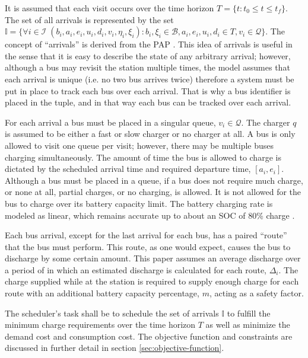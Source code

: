 \documentclass[ee,msthesis]{usuthesis}
\newcommand{\visit}{(b_i, a_i, e_i, u_i, d_i, v_i, \eta_i, \xi_i)}
\newcommand{\I}{\mathbb{I}}                 %
\newcommand{\Iset}{\mathcal{I}}             %
\newcommand{\Bset}{\mathcal{B}}             %
\newcommand{\Qset}{\mathcal{Q}}             %
\begin{document}
It is assumed that each visit occurs over the time horizon \(T = \{t : t_0 \le t \le t_f \}\). The set of all arrivals is
represented by the set \(\I = \{\forall i \in \Iset \; \visit: b_i, \xi_i \in \Bset, a_i, e_i, u_i, d_i \in T, v_i \in \Qset \}\). The
concept of ``arrivals'' is derived from the PAP \cite{qarebagh-2019-optim-sched}. This idea of arrivals is useful in the
sense that it is easy to describe the state of any arbitrary arrival; however, although a bus may revisit the station
multiple times, the model assumes that each arrival is unique (i.e. no two bus arrives twice) therefore a system must be
put in place to track each bus over each arrival. That is why a bus identifier is placed in the tuple, and in that way
each bus can be tracked over each arrival.

For each arrival a bus must be placed in a singular queue, \(v_i \in \Qset\). The charger \(q\) is assumed to be either a fast
or slow charger or no charger at all. A bus is only allowed to visit one queue per visit; however, there may be multiple
buses charging simultaneously. The amount of time the bus is allowed to charge is dictated by the scheduled arrival time
and required departure time, \([a_i, e_i]\). Although a bus must be placed in a queue, if a bus does not require much
charge, or none at all, partial charges, or no charging, is allowed. It is not allowed for the bus to charge over its
battery capacity limit. The battery charging rate is modeled as linear, which remains accurate up to about an SOC of 80\%
charge \cite{li-2016-batter-elect}.

Each bus arrival, except for the last arrival for each bus, has a paired ``route'' that the bus must perform. This route,
as one would expect, causes the bus to discharge by some certain amount. This paper assumes an average discharge over a
period of in which an estimated discharge is calculated for each route, \(\Delta_i\). The charge supplied while at the station
is required to supply enough charge for each route with an additional battery capacity percentage, \(m\), acting as a
safety factor.

The scheduler's task shall be to schedule the set of arrivals \(\I\) to fulfill the minimum charge requirements over the
time horizon \(T\) as well as minimize the demand cost and consumption cost. The objective function and constraints are
discussed in further detail in section \ref{sec:objective-function}.
\end{document}
